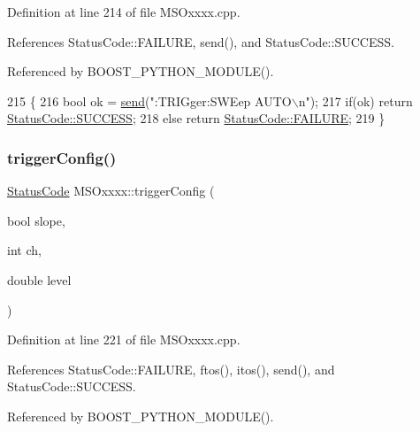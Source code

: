Definition at line 214 of file M\+S\+Oxxxx.\+cpp.



References Status\+Code\+::\+F\+A\+I\+L\+U\+RE, send(), and Status\+Code\+::\+S\+U\+C\+C\+E\+SS.



Referenced by B\+O\+O\+S\+T\+\_\+\+P\+Y\+T\+H\+O\+N\+\_\+\+M\+O\+D\+U\+L\+E().


\begin{DoxyCode}
215 \{
216     \textcolor{keywordtype}{bool} ok = \hyperlink{classMSOxxxx_ae77668a1ae4ccb74e0ed5f2485dfdebf}{send}(\textcolor{stringliteral}{":TRIGger:SWEep AUTO\(\backslash\)n"});
217     \textcolor{keywordflow}{if}(ok)  \textcolor{keywordflow}{return} \hyperlink{classStatusCode_a6f565cbeadc76d14c72f047e5e85eb4badd0da38d3ba0d922efd1f4619bc37ad8}{StatusCode::SUCCESS};
218     \textcolor{keywordflow}{else}        \textcolor{keywordflow}{return} \hyperlink{classStatusCode_a6f565cbeadc76d14c72f047e5e85eb4ba3da73d4c469762eb9d3c960368252b26}{StatusCode::FAILURE};  
219 \}
\end{DoxyCode}
\mbox{\label{classMSOxxxx_a9019b632465638a13c409d8243fe83b4}} 
\subsubsection{\texorpdfstring{trigger\+Config()}{triggerConfig()}}
{\footnotesize\ttfamily \hyperlink{classStatusCode}{Status\+Code} M\+S\+Oxxxx\+::trigger\+Config (\begin{DoxyParamCaption}\item[{bool}]{slope,  }\item[{int}]{ch,  }\item[{double}]{level }\end{DoxyParamCaption})}



Definition at line 221 of file M\+S\+Oxxxx.\+cpp.



References Status\+Code\+::\+F\+A\+I\+L\+U\+RE, ftos(), itos(), send(), and Status\+Code\+::\+S\+U\+C\+C\+E\+SS.



Referenced by B\+O\+O\+S\+T\+\_\+\+P\+Y\+T\+H\+O\+N\+\_\+\+M\+O\+D\+U\+L\+E().


